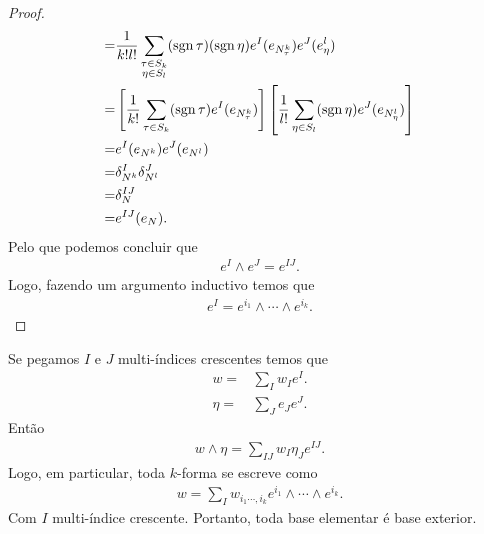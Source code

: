 \begin{proof}
\begin{align*}
    =&\frac{1}{k!l!}\sum_{\substack{\tau\in S_{k}\\\eta\in S_{l}}}(\operatorname{sgn}\tau)(\operatorname{sgn}\eta)e^{I}(e_{N^{k}_{\tau}})e^{J}(e^{l}_{\eta})\\
    =&\left[ \frac{1}{k!}\sum_{\tau\in S_{k}}(\operatorname{sgn}\tau)e^{I}(e_{N^{k}_{\tau}}) \right]\left[ \frac{1}{l!}\sum_{\eta\in S_{l}}(\operatorname{sgn}\eta)e^{J}(e_{N^l_{\eta}}) \right]\\
    =&e^{I}(e_{N^{k}})e^{J}(e_{N^{l}})\\
    =&\delta_{N^{k}}^{I}\delta_{N^{l}}^{J}\\
    =&\delta_{N}^{IJ}\\
    =&e^{IJ}(e_{N}).
  \end{align*}
  Pelo que podemos concluir que
  \begin{align*}
    e^{I}\wedge e^{J}=e^{IJ}.
  \end{align*}
  Logo, fazendo um argumento inductivo temos que
  \begin{align*}
    e^{I}=e^{i_1}\wedge\cdots\wedge e^{i_k}.
  \end{align*}
\end{proof}
\begin{corollary}
  Se pegamos $I$ e $J$ multi-índices crescentes temos que 
  \begin{align*}
    w=&\sum_{I}w_{I}e^{I}.\\
    \eta=&\sum_{J}e_{J}e^{J}.
  \end{align*}
  Então
  \begin{align*}
    w\wedge\eta=\sum_{IJ}w_{I}\eta_{J}e^{IJ}.
  \end{align*}
  Logo, em particular, toda $k$-forma se escreve como
  \begin{align*}
    w=\sum_{I}w_{i_1\cdots,i_k}e^{i_1}\wedge\cdots\wedge e^{i_k}.
  \end{align*}
  Com $I$ multi-índice crescente. Portanto, toda base elementar é base exterior.
\end{corollary}
